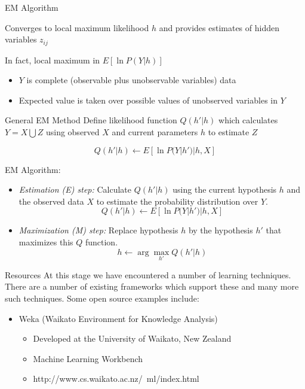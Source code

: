 \documentclass[%
pdf,
colorBG,
slideColor,
tcrico,
]{prosper}
\begin{document}


\begin{slide}{EM Algorithm   }  

Converges to local maximum likelihood $h$ and provides estimates of hidden variables $z_{ij}$

In fact, local maximum in $E[\ln P(Y|h)]$

\begin{itemize} 
\item $Y$ is complete (observable plus unobservable variables) data 
\item Expected value is taken over possible values of unobserved variables in $Y$ 
\end{itemize}
\end{slide}




\begin{slide}{General EM Method   }  
\tiny 
Define likelihood function $Q(h' | h)$ which calculates $Y = X \bigcup Z$ using
observed $X$ and current parameters $h$ to estimate $Z$

\[ Q(h' | h) \gets E[ \ln P(Y | h') | h, X ] \]

EM Algorithm:

\begin{itemize}
\item[]
{\em Estimation (E) step:} Calculate $Q(h'|h)$ using the current hypothesis
$h$ and the observed data $X$ to estimate the probability distribution over
$Y$.
\[ Q(h' | h) \gets E[ \ln P(Y | h') | h, X ] \]

\item[]
{\em Maximization (M) step:} Replace hypothesis $h$ by the hypothesis $h'$
that maximizes this $Q$ function.
\[ h \gets \arg\max_{h'}  Q(h' | h) \]
\end{itemize}
\end{slide}

\begin{slide}{Resources}
At this stage we have encountered a number of learning techniques. There are a number of existing frameworks which support these and many more such techniques. Some open source examples include:
	\begin{itemize}
	\item Weka (Waikato Environment for Knowledge Analysis)
		\begin{itemize}
		\item Developed at the University of Waikato, New Zealand
		\item Machine Learning Workbench
		\item http://www.cs.waikato.ac.nz/~ml/index.html
		\end{itemize}
	\end{itemize}
\end{slide}
\end{document}
